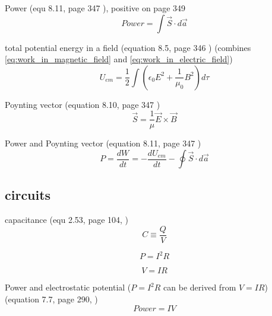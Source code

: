 \documentclass[12pt]{article}  %
\begin{document}
Power (equ 8.11, page 347 \cite{GriffithED}), positive on page 349
\begin{equation}
  Power = \int \vec{S} \cdot d\vec{a}
	\label{eq:power_fields}
\end{equation}

total potential energy in a field (equation 8.5, page 346 \cite{GriffithED}) (combines \ref{eq:work_in_magnetic_field} and \ref{eq:work_in_electric_field})
\begin{equation}
U_{em} = \frac{1}{2} \int ( \epsilon_0 E^2 + \frac{1}{\mu_0} B^2 ) d \tau
\end{equation}


Poynting vector (equation 8.10, page 347 \cite{GriffithED})
\begin{equation}
  \vec{S} = \frac{1}{\mu} \vec{E}\times\vec{B}
	\label{eq:Poynting_vector}
\end{equation}

Power and Poynting vector (equation 8.11, page 347 \cite{GriffithED})
\begin{equation}
P = \frac{dW}{dt} = - \frac{dU_{em}}{dt}- \oint \vec{S} \cdot d\vec{a}
\end{equation}

\subsection{circuits}

capacitance (equ 2.53, page 104, \cite{GriffithED})
\begin{equation}
  C \equiv \frac{Q}{V}
\end{equation}

\begin{equation}
 P=I^2 R
\end{equation}

\begin{equation}
 V=IR
\end{equation}


Power and electrostatic potential ($P=I^2 R$ can be derived from $V=IR$) \\ 
(equation 7.7, page 290, \cite{GriffithED})
\begin{equation}
  Power = I V
	\label{eq:power_current}
\end{equation}
\end{document}
